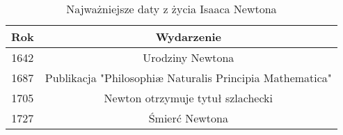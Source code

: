 \begin{table}[h]
    \centering
    \begin{tabular}{|c|c|}
    \hline
    Rok & Wydarzenie \\
    \hline
    1642 & Urodziny Newtona \\
    \hline
    1687 & Publikacja "Philosophiæ Naturalis Principia Mathematica" \\
    \hline
    1705 & Newton otrzymuje tytuł szlachecki \\
    \hline
    1727 & Śmierć Newtona \\
    \hline
    \end{tabular}
    \caption{Najważniejsze daty z życia Isaaca Newtona}
    \label{tab:newton}
\end{table}
